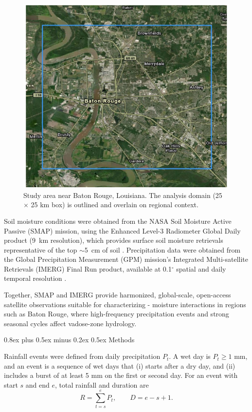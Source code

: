 \documentclass[9pt, twocolumn]{extarticle}
\makeatletter
\renewcommand\section{\@startsection{section}{1}{0pt}%
  {0.8ex plus 0.5ex minus 0.2ex}%
  {0.5ex}%
  {\normalfont\Large\bfseries}}
\makeatother
\begin{document}
\begin{figure}[!h] %
  \centering
  \includegraphics[width=0.85\columnwidth]{map}
  \caption{Study area near Baton Rouge, Louisiana. The analysis domain (25 $\times$ 25 km box) is outlined and overlain on regional context.}
  \label{fig:map}
\end{figure}

Soil moisture conditions were obtained from the NASA Soil Moisture Active Passive (SMAP) mission, using the Enhanced Level-3 Radiometer Global Daily product (9~km resolution), which provides surface soil moisture retrievals representative of the top $\sim$5~cm of soil \cite{smap}. Precipitation data were obtained from the Global Precipitation Measurement (GPM) mission's Integrated Multi-satellite Retrievals (IMERG) Final Run product, available at 0.1$^{\circ}$ spatial and daily temporal resolution \cite{imergdp}.

Together, SMAP and IMERG provide harmonized, global-scale, open-access satellite observations suitable for characterizing - moisture interactions in regions such as Baton Rouge, where high-frequency precipitation events and strong seasonal cycles affect vadose-zone hydrology.

\section{Methods}

Rainfall events were defined from daily precipitation \(P_t\). A wet day is \(P_t \geq 1\) mm, and an event is a sequence of wet days that (i) starts after a dry day, and (ii) includes a burst of at least 5 mm on the first or second day. For an event with start \(s\) and end \(e\), total rainfall and duration are  
\[
R = \sum_{t=s}^{e} P_t, 
\qquad 
D = e - s + 1.
\]
\end{document}
